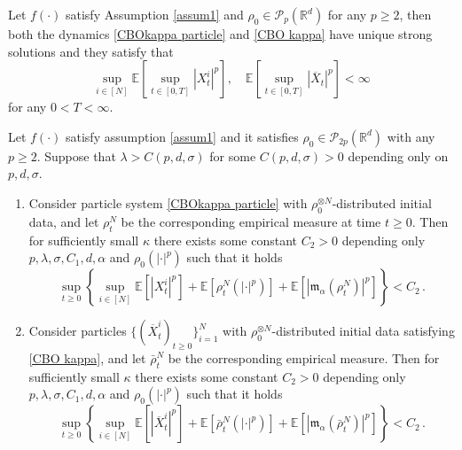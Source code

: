 \documentclass[10pt,a4paper]{amsart}
\newcommand{\EE}{{\mathbb E}}
\newcommand{\OX}{{\overline{X}}}
\newcommand{\RR}{{\mathbb R}}
\newcommand{\mm}{{\mathfrak{m}}}
\begin{document}
\begin{lemma}\label{thmexist}  
	Let $f(\cdot)$ satisfy Assumption \ref{assum1} and $\rho_0\in\mathscr{P}_{p}(\RR^d)$ for any $p\geq 2$, then both the dynamics \eqref{CBOkappa particle} and \eqref{CBO kappa} have unique strong solutions and they satisfy that
	\begin{equation}\label{mbound}
		\sup_{i\in[N]}\EE\left[\sup_{t\in[0,T]}|X_t^i|^{p}\right],\quad \EE\left[\sup_{t\in[0,T]} |\OX_t|^{p}\right]<\infty
	\end{equation}
	for any $0<T<\infty$. %
\end{lemma} 

\begin{theorem}\label{thm: finite moments}
	Let $f(\cdot)$ satisfy assumption \ref{assum1} and it satisfies $\rho_0\in\mathscr{P}_{2p}(\RR^d)$ with any $p\geq 2$. Suppose that $\lambda> C(p,d,\sigma)$ for some $C(p,d,\sigma)>0$ depending only on $p,d,\sigma$.
	\begin{enumerate}
		\item Consider particle system \eqref{CBOkappa particle} with $\rho_0^{\otimes N}$-distributed initial data, and let $\rho_t^N$ be the corresponding empirical measure at time $t\geq 0$. Then for sufficiently small $\kappa$ there exists some constant $C_2>0$ depending only $p,\lambda,\sigma,C_1,d,\alpha$ and $\rho_0(|\cdot|^p)$ such that it holds
		\begin{equation}\label{eq(1)}
			\sup_{t\geq 0}\left\{\sup_{i\in[N]}\EE[|X_t^i|^p]+\EE[\rho_t^N(|\cdot|^p)]+\EE[|\mm_\alpha(\rho_t^N)|^p]\right\}<C_2\,.
		\end{equation}
		\item Consider particles  $\{(\OX_t^i)_{t\geq 0}\}_{i=1}^N$  with $\rho_0^{\otimes N}$-distributed initial data satisfying \eqref{CBO kappa}, and let $\bar \rho_t^N$ be the corresponding empirical measure. Then  for sufficiently small $\kappa$ there exists some constant $C_2>0$ depending only $p,\lambda,\sigma,C_1,d,\alpha$ and $\rho_0(|\cdot|^p)$  such that it holds 
		\begin{equation}\label{eq(2)}
			\sup_{t\geq 0}\left\{\sup_{i\in[N]}\EE[|\OX_t^i|^p]+\EE[\bar\rho_t^N(|\cdot|^p)]+\EE[|\mm_\alpha(\bar \rho_t^N)|^p]\right\}<C_2\,.
		\end{equation}
	\end{enumerate}
\end{theorem}
\end{document}
